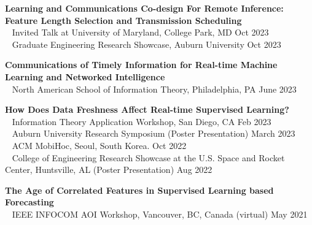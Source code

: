 \documentclass[letterpaper,11pt]{article}
\begin{document}
\textbf{Learning and Communications Co-design For Remote Inference: Feature Length Selection and Transmission Scheduling} \\
\quad\textbullet~ Invited Talk at University of Maryland, College Park, MD \hfill Oct 2023 \\
\quad\textbullet~ Graduate Engineering Research Showcase, Auburn University \hfill Oct 2023
\medskip

\textbf{Communications of Timely Information for Real-time Machine Learning and Networked Intelligence} \\
\quad\textbullet~ North American School of Information Theory, Philadelphia, PA \hfill June 2023
\medskip

\textbf{How Does Data Freshness Affect Real-time Supervised Learning?} \\
\quad\textbullet~ Information Theory Application Workshop, San Diego, CA \hfill Feb 2023 \\
\quad\textbullet~ Auburn University Research Symposium (Poster Presentation) \hfill March 2023 \\
\quad\textbullet~ ACM MobiHoc, Seoul, South Korea. \hfill Oct 2022 \\
\quad\textbullet~ College of Engineering Research Showcase at the U.S. Space and Rocket Center, Huntsville, AL (Poster Presentation) \hfill Aug 2022
\medskip

\textbf{The Age of Correlated Features in Supervised Learning based Forecasting} \\
\quad\textbullet~ IEEE INFOCOM AOI Workshop, Vancouver, BC, Canada (virtual) \hfill May 2021
\end{document}
